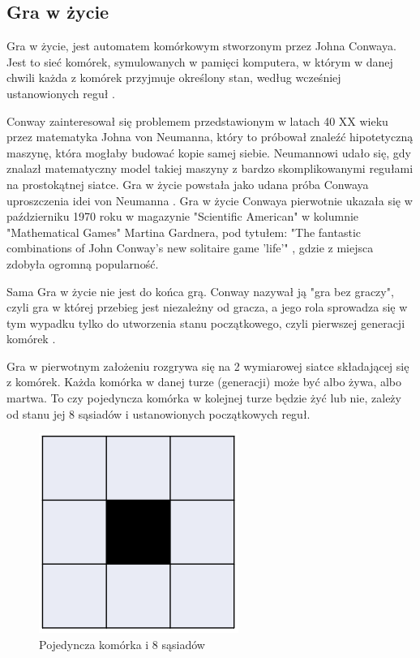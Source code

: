 \documentclass[a4paper,12pt,reqno]{article}
\begin{document}
\newpage
\subsection{Gra w życie}

Gra w życie, jest automatem komórkowym stworzonym przez Johna Conwaya. Jest to sieć komórek, symulowanych w pamięci komputera, w którym w danej chwili każda z komórek przyjmuje określony stan, według wcześniej ustanowionych reguł \cite{game_of_life_zero_cellular_automata}. 

Conway zainteresował się problemem przedstawionym w latach 40 XX wieku przez matematyka Johna von Neumanna, który to próbował znaleźć hipotetyczną maszynę, która mogłaby budować kopie samej siebie. Neumannowi udało się, gdy znalazł matematyczny model takiej maszyny z bardzo skomplikowanymi regułami na prostokątnej siatce. Gra w życie powstała jako udana próba Conwaya uproszczenia idei von Neumanna \cite{game_of_life_story}. Gra w życie Conwaya pierwotnie ukazała się w październiku 1970 roku w magazynie "Scientific American" w kolumnie "Mathematical Games" Martina Gardnera, pod tytułem: "The fantastic combinations of John Conway's new solitaire game 'life'" \cite{game_of_life_methematical_games}, gdzie z miejsca zdobyła ogromną popularność.


 Sama Gra w życie nie jest do końca grą. Conway nazywał ją "gra bez graczy", czyli gra w której przebieg jest niezależny od gracza, a jego rola sprowadza się w tym wypadku tylko do utworzenia stanu początkowego, czyli pierwszej generacji komórek \cite{game_of_life_zero_player}. 


 Gra w pierwotnym założeniu rozgrywa się na 2 wymiarowej siatce składającej się z komórek. Każda komórka w danej turze (generacji) może być albo żywa, albo martwa. To czy pojedyncza komórka w kolejnej turze będzie żyć lub nie, zależy od stanu jej 8 sąsiadów i ustanowionych początkowych reguł.

\begin{figure}[H]%
\centering
\includegraphics[width=0.2\columnwidth]{graphics//gameoflife/GOL_Cell.png}
\caption{Pojedyncza komórka i 8 sąsiadów 
\label{BPExample}}%
%
\qquad
\end{figure} 
\end{document}
